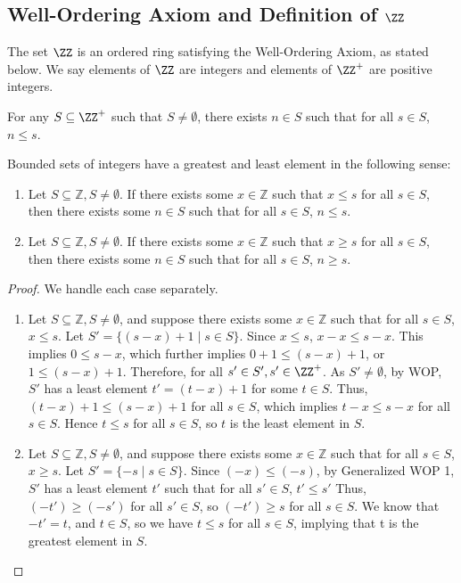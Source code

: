 \subsection{Well-Ordering Axiom and Definition of $\ZZ$}
\begin{definition} \label{def-of-Z}
     The set $\ZZ$ is an ordered ring satisfying the Well-Ordering Axiom, as stated below. We say elements of $\ZZ$ are integers and elements of $\ZZ^+$ are positive integers.
\end{definition}

\begin{axiom}\label{well-ordering}
     For any $S \subseteq \ZZ^+$ such that $S \neq \emptyset $, there exists $n \in S$ such that for all $s \in S$, $n \leq s$. 
\end{axiom}

\begin{theorem} \label{gen_wop}
Bounded sets of integers have a greatest and least element in the following sense:
\begin{enumerate}
    \item Let $S \subseteq \mathbb{Z}, S \neq \emptyset$. If there exists some $x \in \mathbb{Z}$ such that $x \leq s$ for all $s \in S$, then there exists some $n \in S$ such that for all $s \in S$, $n \leq s$.

    \item Let $S \subseteq \mathbb{Z}, S \neq \emptyset$. If there exists some $x \in \mathbb{Z}$ such that $x \geq s$ for all $s \in S$, then there exists some $n \in S$ such that for all $s \in S$, $n \geq s$.
\end{enumerate}
\end{theorem}
\begin{proof} 
We handle each case separately.
\begin{enumerate} 
    \item Let $S \subseteq \mathbb{Z}, S \neq \emptyset$, and suppose there exists some $x \in \mathbb{Z}$ such that for all $s \in S$, $x \leq s$. Let $S' = \{(s - x)+1 \mid s \in S\}$. Since $x \leq s$, $x - x \leq s - x$. This implies $0 \leq s - x$, which further implies  $0+1 \leq (s - x)+1$, or $1 \leq (s - x)+1$. Therefore, for all $s' \in S', s'\in \ZZ^+$. As $S' \neq \emptyset$, by WOP, $S'$ has a least element $t'=(t-x)+1$ for some $t\in S$. Thus, $(t - x)+1 \leq (s-x)+1$ for all $s \in S$, which implies $t - x \leq s - x$  for all $s \in S$. Hence $t \leq s$ for all $s \in S$, so $t$ is the least element in $S$.
    
    \item Let $S \subseteq \mathbb{Z}, S \neq \emptyset$, and suppose there exists some $x \in \mathbb{Z}$ such that for all $s \in S$, $x \geq s$. Let $S' = \{- s \mid s \in S\}$. Since $(-x)\leq(-s)$, by  Generalized WOP 1, $S'$ has a least element $t' $ such that for all $s' \in S$, $t'\leq s'$ Thus, $(-t') \geq (-s')$ for all $s' \in S$, so $(-t') \geq s$ for all $s \in S$. We know that $-t'=t$, and $t \in S$, so we have $t \leq s$ for all $s \in S$, implying that t is the greatest element in $S$.
\end{enumerate}
\end{proof}


